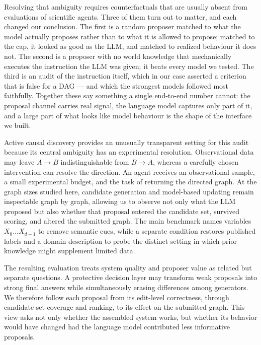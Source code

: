 \documentclass{article}
\begin{document}
Resolving that ambiguity requires counterfactuals that are usually absent from evaluations of
scientific agents. Three of them turn out to matter, and each changed our conclusion. The first is a
random proposer matched to what the model actually proposes rather than to what it is allowed to
propose; matched to the cap, it looked as good as the LLM, and matched to realized behaviour it does
not. The second is a proposer with no world knowledge that mechanically executes the instruction the
LLM was given; it beats every model we tested. The third is an audit of the instruction itself,
which in our case asserted a criterion that is false for a DAG --- and which the strongest models
followed most faithfully. Together these say something a single end-to-end number cannot: the
proposal channel carries real signal, the language model captures only part of it, and a large part
of what looks like model behaviour is the shape of the interface we built.

Active causal discovery provides an unusually transparent setting for this audit because its central
ambiguity has an experimental resolution. Observational data may leave $A \to B$ indistinguishable
from $B \to A$, whereas a carefully chosen intervention can resolve the direction. An agent receives
an observational sample, a small experimental budget, and
the task of returning the directed graph. At the graph sizes studied here, candidate generation and
model-based updating remain inspectable graph by graph, allowing us to observe not only what the LLM
proposed but also whether that proposal entered the candidate set, survived scoring, and altered the
submitted graph. The main benchmark names variables $X_0 \dots X_{d-1}$ to remove semantic cues,
while a separate condition restores published labels and a domain description to probe the distinct
setting in which prior knowledge might supplement limited data.

The resulting evaluation treats system quality and proposer value as related but separate questions.
A protective decision layer may transform weak proposals into strong final answers while
simultaneously erasing differences among generators. We therefore follow each proposal from its
edit-level correctness, through candidate-set coverage and ranking, to its effect on the submitted
graph. This view asks not only whether the assembled system works, but whether its behavior would
have changed had the language model contributed less informative proposals.
\end{document}
